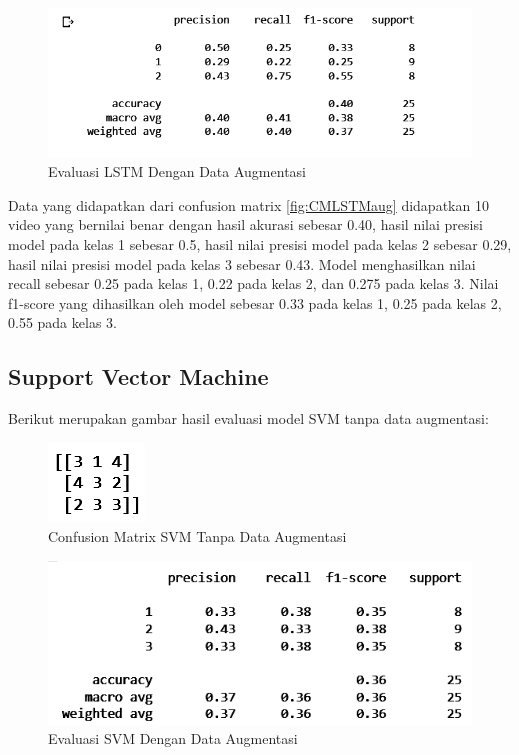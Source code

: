 \begin{figure} [ht] \centering
  \includegraphics[scale=0.55]{gambar/scoreLSTMaug.png}
  \caption{Evaluasi LSTM Dengan Data Augmentasi}
  \label{fig:ScoreLSTMaug}
\end{figure}
Data yang didapatkan dari confusion matrix \ref{fig:CMLSTMaug} didapatkan 10 video yang bernilai benar
dengan hasil akurasi sebesar 0.40, hasil nilai presisi model pada kelas 1 sebesar 0.5, hasil nilai
presisi model pada kelas 2 sebesar 0.29, hasil nilai presisi model pada kelas 3 sebesar 0.43. Model menghasilkan
nilai recall sebesar 0.25 pada kelas 1, 0.22 pada kelas 2, dan 0.275 pada kelas 3. Nilai f1-score yang dihasilkan
oleh model sebesar 0.33 pada kelas 1, 0.25 pada kelas 2, 0.55 pada kelas 3.

\subsection{Support Vector Machine}
Berikut merupakan gambar hasil evaluasi model SVM tanpa data augmentasi:

\newpage
\begin{figure} [ht] \centering
  \includegraphics[scale=2.5]{gambar/CMSVMnoAug.png}
  \caption{Confusion Matrix SVM Tanpa Data Augmentasi}
  \label{fig:CMSVMnoaug}
\end{figure}

\begin{figure} [ht] \centering
  \includegraphics[scale=0.55]{gambar/scoreSVMnoaug.png}
  \caption{Evaluasi SVM Dengan Data Augmentasi}
  \label{fig:ScoreSVMnoaug}
\end{figure}

